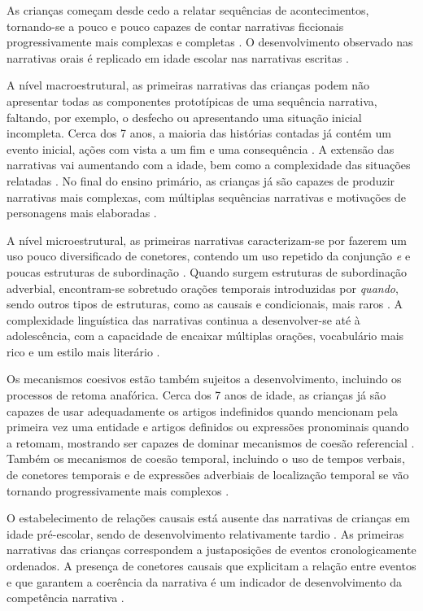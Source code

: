 \documentclass[output=paper,colorlinks,citecolor=brown,booklanguage=portuguese]{langscibook}
\begin{document}
As crianças começam desde cedo a relatar sequências de acontecimentos, tor\-nando-se a pouco e pouco capazes de contar narrativas ficcionais progressivamente mais complexas e completas \citep{Silva2000, Bento2010}. O desenvolvimento observado nas narrativas orais é replicado em idade escolar nas narrativas escritas \citep{EncarnacaoSilva2001}.

A nível macroestrutural, as primeiras narrativas das crianças podem não apresentar todas as componentes prototípicas de uma sequência narrativa, faltando, por exemplo, o desfecho ou apresentando uma situação inicial incompleta. Cerca dos 7 anos, a maioria das histórias contadas já contém um evento inicial, ações com vista a um fim e uma consequência \citep{Gillam2017}. A extensão das narrativas vai aumentando com a idade, bem como a complexidade das situações relatadas \citep{Sousa2007, Sousa2010}. No final do ensino primário, as crianças já são capazes de produzir narrativas mais complexas, com múltiplas sequências narrativas e motivações de personagens mais elaboradas \citep{Gillam2017}.

A nível microestrutural, as primeiras narrativas caracterizam-se por fazerem um uso pouco diversificado de conetores, contendo um uso repetido da conjunção \emph{e} e poucas estruturas de subordinação \citep{Goncalves2011a}. Quando surgem estruturas de subordinação adverbial, encontram-se sobretudo orações temporais introduzidas por \emph{quando}, sendo outros tipos de estruturas, como as causais e condicionais, mais raros \citep{EncarnacaoSilva2001, Goncalves2011a}. A complexidade linguística das narrativas continua a desenvolver-se até à adolescência, com a capacidade de encaixar múltiplas orações, vocabulário mais rico e um estilo mais literário \citep{Gillam2017}.

Os mecanismos coesivos estão também sujeitos a desenvolvimento, incluindo os processos de retoma anafórica. Cerca dos 7 anos de idade, as crianças já são capazes de usar adequadamente os artigos indefinidos quando mencionam pela primeira vez uma entidade e artigos definidos ou expressões pronominais quando a retomam, mostrando ser capazes de dominar mecanismos de coesão referencial \citep{Goncalves2011a}. Também os mecanismos de coesão temporal, incluindo o uso de tempos verbais, de conetores temporais e de expressões adverbiais de localização temporal se vão tornando progressivamente mais complexos \citep{Sousa2007}.

O estabelecimento de relações causais está ausente das narrativas de crianças em idade pré-escolar, sendo de desenvolvimento relativamente tardio \citep{Sousa2007, Sousa2010}. As primeiras narrativas das crianças correspondem a justaposições de eventos cronologicamente ordenados. A presença de conetores causais que explicitam a relação entre eventos e que garantem a coerência da narrativa é um indicador de desenvolvimento da competência narrativa \citep{Sousa2010}.
\end{document}
